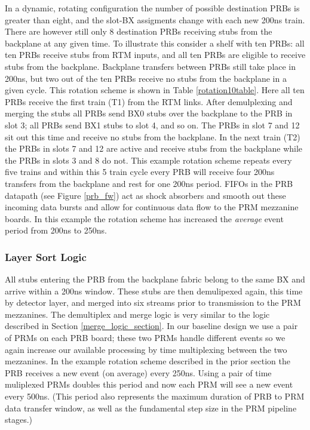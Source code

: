 \documentclass[letterpaper]{article}
\begin{document}
In a dynamic, rotating configuration the number of possible destination PRBs is greater than eight, and the slot-BX assigments change with each new 200ns train.  There are however still only 8 destination PRBs receiving stubs from the backplane at any given time.  To illustrate this consider a shelf with ten PRBs: all ten PRBs receive stubs from RTM inputs, and all ten PRBs are eligible to receive stubs from the backplane.  Backplane transfers between PRBs still take place in 200ns, but two out of the ten PRBs receive no stubs from the backplane in a given cycle.  This rotation scheme is shown in Table \ref{rotation10table}.  Here all ten PRBs receive the first train (T1) from the RTM links.  After demulplexing and merging the stubs all PRBs send BX0 stubs over the backplane to the PRB in slot 3; all PRBs send BX1 stubs to slot 4, and so on.  The PRBs in slot 7 and 12 sit out this time and receive no stubs from the backplane.  In the next train (T2) the PRBs in slots 7 and 12 are active and receive stubs from the backplane while the PRBs in slots 3 and 8 do not.  This example rotation scheme repeats every five trains and within this 5 train cycle every PRB will receive four 200ns transfers from the backplane and rest for one 200ns period.  FIFOs in the PRB datapath (see Figure \ref{prb_fw}) act as shock absorbers and smooth out these incoming data bursts and allow for continuous data flow to the PRM mezzanine boards.  In this example the rotation scheme has increased the \emph{average} event period from 200ns to 250ns.

\subsubsection {Layer Sort Logic}

All stubs entering the PRB from the backplane fabric belong to the same BX and arrive within a 200ns window.  These stubs are then demulipexed again, this time by detector layer, and merged into six streams prior to transmission to the PRM mezzanines.  The demultiplex and merge logic is very similar to the logic described in Section \ref{merge_logic_section}.  In our baseline design we use a pair of PRMs on each PRB board; these two PRMs handle different events so we again increase our available processing by time multiplexing between the two mezzanines.  In the example rotation scheme described in the prior section the PRB receives a new event (on average) every 250ns.  Using a pair of time muliplexed PRMs doubles this period and now each PRM will see a new event every 500ns.  (This period also represents the maximum duration of PRB to PRM data transfer window, as well as the fundamental step size in the PRM pipeline stages.)
\end{document}
